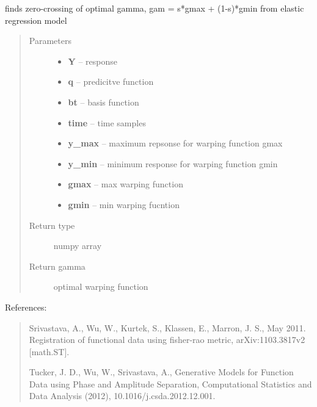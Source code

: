 \documentclass[letterpaper,10pt,english]{sphinxmanual}
\begin{document}
\begin{fulllineitems}
\label{utility_functions:utility_functions.zero_crossing}
finds zero-crossing of optimal gamma, gam = s*gmax + (1-s)*gmin from elastic regression model
\begin{quote}\begin{description}
\item[{Parameters}] \leavevmode\begin{itemize}
\item {} 
\textbf{Y} -- response

\item {} 
\textbf{q} -- predicitve function

\item {} 
\textbf{bt} -- basis function

\item {} 
\textbf{time} -- time samples

\item {} 
\textbf{y\_max} -- maximum repsonse for warping function gmax

\item {} 
\textbf{y\_min} -- minimum response for warping function gmin

\item {} 
\textbf{gmax} -- max warping function

\item {} 
\textbf{gmin} -- min warping fucntion

\end{itemize}

\item[{Return type}] \leavevmode
numpy array

\item[{Return gamma}] \leavevmode
optimal warping function

\end{description}\end{quote}

\end{fulllineitems}


References:
\begin{quote}

Srivastava, A., Wu, W., Kurtek, S., Klassen, E., Marron, J. S., May 2011. Registration of functional data using
fisher-rao metric, arXiv:1103.3817v2 {[}math.ST{]}.

Tucker, J. D., Wu, W., Srivastava, A., Generative Models for Function Data using Phase and Amplitude Separation,
Computational Statistics and Data Analysis (2012), 10.1016/j.csda.2012.12.001.
\end{quote}
\end{document}

